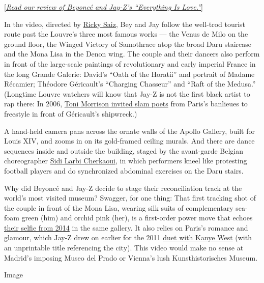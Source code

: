 {[}\href{https://www.nytimes.com/2018/06/17/arts/music/beyonce-jay-z-the-carters-everything-is-love-review.html}{\emph{Read
our review of Beyoncé and Jay-Z's ``Everything Is Love.''}}{]}

In the video, directed by
\href{https://www.nytimes.com/slideshow/2016/10/09/fashion/new-york-film-festival-american-red-cross/s/09SCENE-CITY-slide-PWJN.html}{Ricky
Saiz}, Bey and Jay follow the well-trod tourist route past the Louvre's
three most famous works --- the Venus de Milo on the ground floor, the
Winged Victory of Samothrace atop the broad Daru staircase and the Mona
Lisa in the Denon wing. The couple and their dancers also perform in
front of the large-scale paintings of revolutionary and early imperial
France in the long Grande Galerie: David's ``Oath of the Horatii'' and
portrait of Madame Récamier; Théodore Géricault's ``Charging Chasseur''
and ``Raft of the Medusa.'' (Longtime Louvre watchers will know that
Jay-Z is not the first black artist to rap there: In 2006,
\href{https://www.nytimes.com/2006/11/21/books/21morr.html}{Toni
Morrison invited slam poets} from Paris's banlieues to freestyle in
front of Géricault's shipwreck.)

A hand-held camera pans across the ornate walls of the Apollo Gallery,
built for Louis XIV, and zooms in on its gold-framed ceiling murals. And
there are dance sequences inside and outside the building, staged by the
avant-garde Belgian choreographer
\href{https://www.nytimes.com/2009/10/11/arts/dance/11sulc.html}{Sidi
Larbi Cherkaoui}, in which performers kneel like protesting football
players and do synchronized abdominal exercises on the Daru stairs.

Why did Beyoncé and Jay-Z decide to stage their reconciliation track at
the world's most visited museum? Swagger, for one thing: That first
tracking shot of the couple in front of the Mona Lisa, wearing silk
suits of complementary sea-foam green (him) and orchid pink (her), is a
first-order power move that echoes
\href{https://www.telegraph.co.uk/news/celebritynews/11159162/Beyonce-most-irritating-selfies-of-all-time.html}{their
selfie from 2014} in the same gallery. It also relies on Paris's romance
and glamour, which Jay-Z drew on earlier for the 2011
\href{https://www.youtube.com/watch?v=gG_dA32oH44}{duet with Kanye West}
(with an unprintable title referencing the city). This video would make
no sense at Madrid's imposing Museo del Prado or Vienna's lush
Kunsthistorisches Museum.

Image

